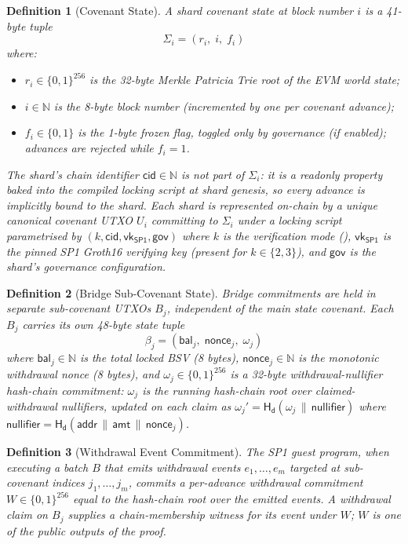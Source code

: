 \documentclass[11pt,a4paper]{article}
\newtheorem{definition}{Definition}[section]
\newcommand{\Hashd}{\mathsf{H_d}}        %
\newcommand{\SPone}{\mathsf{SP1}}
\newcommand{\vkSP}{\mathsf{vk}_{\SPone}}           %
\begin{document}
\begin{definition}[Covenant State]\label{def:state}
A shard covenant state at block number $i$ is a 41-byte tuple
\[
    \Sigma_i = (r_i,\; i,\; f_i)
\]
where:
\begin{itemize}[nosep]
    \item $r_i \in \{0,1\}^{256}$ is the 32-byte Merkle Patricia Trie root of the EVM world state;
    \item $i \in \mathbb{N}$ is the 8-byte block number (incremented by one per covenant advance);
    \item $f_i \in \{0, 1\}$ is the 1-byte frozen flag, toggled only by governance (if enabled); advances are rejected while $f_i = 1$.
\end{itemize}
The shard's chain identifier $\mathsf{cid} \in \mathbb{N}$ is \emph{not} part of $\Sigma_i$: it is a readonly property baked into the compiled locking script at shard genesis, so every advance is implicitly bound to the shard. Each shard is represented on-chain by a unique canonical covenant UTXO $U_i$ committing to $\Sigma_i$ under a locking script parametrised by $(k, \mathsf{cid}, \vkSP, \mathsf{gov})$ where $k$ is the verification mode (), $\vkSP$ is the pinned SP1 Groth16 verifying key (present for $k \in \{2, 3\}$), and $\mathsf{gov}$ is the shard's governance configuration.
\end{definition}

\begin{definition}[Bridge Sub-Covenant State]\label{def:bridge-state}
Bridge commitments are held in separate sub-covenant UTXOs $B_j$, independent of the main state covenant. Each $B_j$ carries its own 48-byte state tuple
\[
    \beta_j = (\mathsf{bal}_j,\; \mathsf{nonce}_j,\; \omega_j)
\]
where $\mathsf{bal}_j \in \mathbb{N}$ is the total locked BSV (8 bytes), $\mathsf{nonce}_j \in \mathbb{N}$ is the monotonic withdrawal nonce (8 bytes), and $\omega_j \in \{0,1\}^{256}$ is a 32-byte \emph{withdrawal-nullifier hash-chain commitment}: $\omega_j$ is the running hash-chain root over claimed-withdrawal nullifiers, updated on each claim as $\omega_j' = \Hashd(\omega_j \,\|\, \mathsf{nullifier})$ where $\mathsf{nullifier} = \Hashd(\mathsf{addr}\,\|\,\mathsf{amt}\,\|\,\mathsf{nonce}_j)$.
\end{definition}

\begin{definition}[Withdrawal Event Commitment]\label{def:wd-event-commitment}
The SP1 guest program, when executing a batch $B$ that emits withdrawal events $e_1, \ldots, e_m$ targeted at sub-covenant indices $j_1, \ldots, j_m$, commits a per-advance \emph{withdrawal commitment} $W \in \{0,1\}^{256}$ equal to the hash-chain root over the emitted events. A withdrawal claim on $B_j$ supplies a chain-membership witness for its event under $W$; $W$ is one of the public outputs of the proof.
\end{definition}
\end{document}
